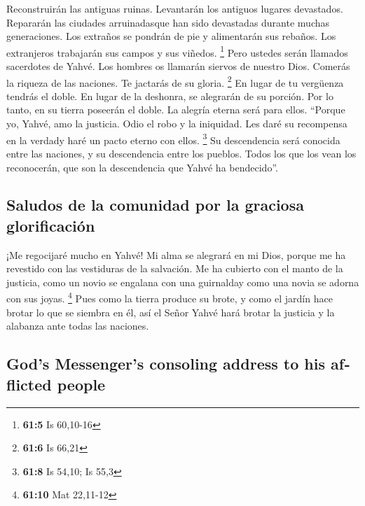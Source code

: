 \begin{paracol}{2}
 Reconstruirán las antiguas ruinas. Levantarán los
antiguos lugares devastados. Repararán las ciudades arruinadasque han
sido devastadas durante muchas generaciones.  Los extraños
se pondrán de pie y alimentarán sus rebaños. Los extranjeros trabajarán
sus campos y sus viñedos. \footnote{\textbf{61:5} Is 60,10-16}
 Pero ustedes serán llamados sacerdotes de Yahvé. Los
hombres os llamarán siervos de nuestro Dios. Comerás la riqueza de las
naciones. Te jactarás de su gloria. \footnote{\textbf{61:6} Is 66,21}
 En lugar de tu vergüenza tendrás el doble. En lugar de la
deshonra, se alegrarán de su porción. Por lo tanto, en su tierra
poseerán el doble. La alegría eterna será para ellos. 
``Porque yo, Yahvé, amo la justicia. Odio el robo y la iniquidad. Les
daré su recompensa en la verdady haré un pacto eterno con ellos.
\footnote{\textbf{61:8} Is 54,10; Is 55,3}  Su
descendencia será conocida entre las naciones, y su descendencia entre
los pueblos. Todos los que los vean los reconocerán, que son la
descendencia que Yahvé ha bendecido''.

\hypertarget{saludos-de-la-comunidad-por-la-graciosa-glorificaciuxf3n}{%
\subsection{Saludos de la comunidad por la graciosa
glorificación}\label{saludos-de-la-comunidad-por-la-graciosa-glorificaciuxf3n}}

 ¡Me regocijaré mucho en Yahvé! Mi alma se alegrará en mi
Dios, porque me ha revestido con las vestiduras de la salvación. Me ha
cubierto con el manto de la justicia, como un novio se engalana con una
guirnalday como una novia se adorna con sus joyas. \footnote{\textbf{61:10}
  Mat 22,11-12}  Pues como la tierra produce su brote, y
como el jardín hace brotar lo que se siembra en él, así el Señor Yahvé
hará brotar la justicia y la alabanza ante todas las naciones.

\switchcolumn
\begin{otherlanguage}{english}

\hypertarget{gods-messengers-consoling-address-to-his-afflicted-people}{%
\subsection{God's Messenger's consoling address to his afflicted
people}\label{gods-messengers-consoling-address-to-his-afflicted-people}}


\end{otherlanguage}
\end{paracol}
